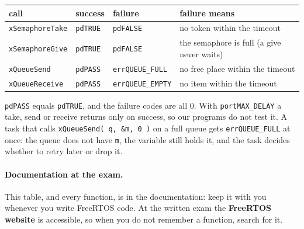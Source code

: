 \begin{center}
\small
\begin{tabular}{l l l P{0.3}}
    \hline
    \textbf{call} & \textbf{success} & \textbf{failure} & \textbf{failure means} \\
    \hline
    \texttt{xSemaphoreTake} & \texttt{pdTRUE} & \texttt{pdFALSE} & no token within the timeout \\
    \texttt{xSemaphoreGive} & \texttt{pdTRUE} & \texttt{pdFALSE} & the semaphore is full (a give never waits) \\
    \texttt{xQueueSend} & \texttt{pdPASS} & \texttt{errQUEUE\_FULL} & no free place within the timeout \\
    \texttt{xQueueReceive} & \texttt{pdPASS} & \texttt{errQUEUE\_EMPTY} & no item within the timeout \\
    \hline
\end{tabular}
\end{center}
\texttt{pdPASS} equals \texttt{pdTRUE}, and the failure codes are all 0. With \texttt{portMAX\_DELAY} a take, send or receive returns only on success, so our programs do not test it. A task that calls \texttt{xQueueSend( q, \&m, 0 )} on a full queue gets \texttt{errQUEUE\_FULL} at once: the queue does not have \texttt{m}, the variable still holds it, and the task decides whether to retry later or drop it.

\paragraph{Documentation at the exam.} This table, and every function, is in the documentation: keep it with you whenever you write FreeRTOS code. At the written exam the \textbf{FreeRTOS website} is accessible, so when you do not remember a function, search for it.

